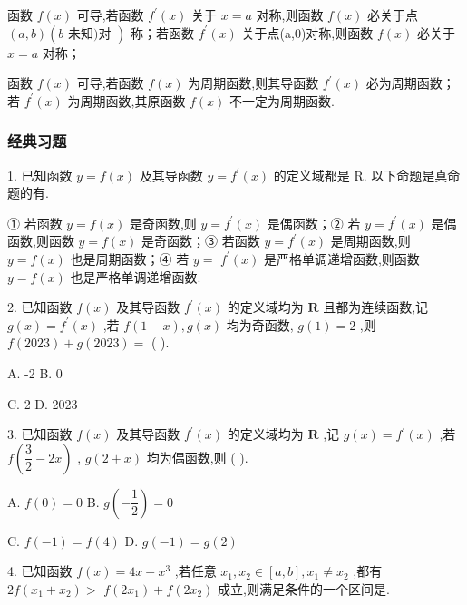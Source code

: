 函数 $f\left( x\right)$ 可导,若函数 ${f}^{\prime }\left( x\right)$ 关于 $x = a$ 对称,则函数 $f\left( x\right)$ 必关于点 $\left( {a,b}\right) \left( {b\text{ 未知)对 }}\right)$ 称；若函数 ${f}^{\prime }\left( x\right)$ 关于点(a,0)对称,则函数 $f\left( x\right)$ 必关于 $x = a$ 对称；

函数 $f\left( x\right)$ 可导,若函数 $f\left( x\right)$ 为周期函数,则其导函数 ${f}^{\prime }\left( x\right)$ 必为周期函数；若 ${f}^{\prime }\left( x\right)$ 为周期函数,其原函数 $f\left( x\right)$ 不一定为周期函数.

\subsubsection*{经典习题}

1. 已知函数 $y = f\left( x\right)$ 及其导函数 $y = {f}^{\prime }\left( x\right)$ 的定义域都是 R. 以下命题是真命题的有\blkda{}.

① 若函数 $y = f\left( x\right)$ 是奇函数,则 $y = {f}^{\prime }\left( x\right)$ 是偶函数；② 若 $y = {f}^{\prime }\left( x\right)$ 是偶函数,则函数 $y = f\left( x\right)$ 是奇函数；③ 若函数 $y = {f}^{\prime }\left( x\right)$ 是周期函数,则 $y = f\left( x\right)$ 也是周期函数；④ 若 $y =$  ${f}^{\prime }\left( x\right)$ 是严格单调递增函数,则函数 $y = f\left( x\right)$ 也是严格单调递增函数.

2. 已知函数 $f\left( x\right)$ 及其导函数 ${f}^{\prime }\left( x\right)$ 的定义域均为 $\mathbf{R}$ 且都为连续函数,记 $g\left( x\right)  = {f}^{\prime }\left( x\right)$ ,若 $f\left( {1 - x}\right) ,g\left( x\right)$ 均为奇函数, $g\left( 1\right)  = 2$ ,则 $f\left( {2023}\right)  + g\left( {2023}\right)  =$ (   ).

A. -2 B. 0

C. 2 D. 2023

3. 已知函数 $f\left( x\right)$ 及其导函数 ${f}^{\prime }\left( x\right)$ 的定义域均为 $\mathbf{R}$ ,记 $g\left( x\right)  = {f}^{\prime }\left( x\right)$ ,若 $f\left( {\dfrac{3}{2} - {2x}}\right)$ , $g\left( {2 + x}\right)$ 均为偶函数,则 (   ).

A. $f\left( 0\right)  = 0$ B. $g\left( {-\dfrac{1}{2}}\right)  = 0$

C. $f\left( {-1}\right)  = f\left( 4\right)$ D. $g\left( {-1}\right)  = g\left( 2\right)$

4. 已知函数 $f\left( x\right)  = {4x} - {x}^{3}$ ,若任意 ${x}_{1},{x}_{2} \in  \left\lbrack  {a,b}\right\rbrack  ,{x}_{1} \neq  {x}_{2}$ ,都有 ${2f}\left( {{x}_{1} + {x}_{2}}\right)  >$  $f\left( {2{x}_{1}}\right)  + f\left( {2{x}_{2}}\right)$ 成立,则满足条件的一个区间是\blkda{}.

